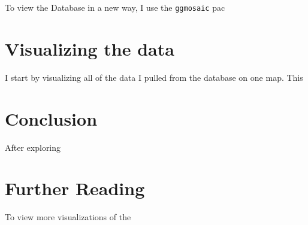 \documentclass[DIV=calc, paper=a4, fontsize=10pt, twocolumn]{scrartcl}	 %
\begin{document}
\par To view the   Database in a new way, I use the \texttt{ggmosaic} pac

\section*{Visualizing the data}

I start by visualizing all of the data I pulled from the database on one map. This

\section*{Conclusion}

After exploring
%
%
\section*{Further Reading}
To view more visualizations of the

\end{document}
